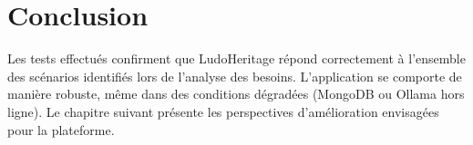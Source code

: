 \section{Conclusion}

Les tests effectués confirment que LudoHeritage répond correctement à l'ensemble des scénarios
identifiés lors de l'analyse des besoins. L'application se comporte de manière robuste, même
dans des conditions dégradées (MongoDB ou Ollama hors ligne). Le chapitre suivant présente
les perspectives d'amélioration envisagées pour la plateforme.
